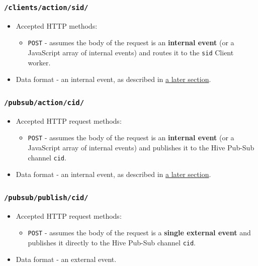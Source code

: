 \documentclass[a4paper]{article}
\begin{document}
\subsubsection{\texttt{/clients/action/sid/}}
\label{sec-6-1-5}



\begin{itemize}
\item Accepted HTTP methods:
\begin{itemize}
\item \texttt{POST} - assumes the body of the request is an \textbf{internal event} (or a JavaScript array of internal events) and routes it to the \texttt{sid} Client worker.
\end{itemize}
\item Data format - an internal event, as described in \hyperref[sec-9-3]{a later section}.
\end{itemize}
\subsubsection{\texttt{/pubsub/action/cid/}}
\label{sec-6-1-6}
\label{ref-api_pubsub}



\begin{itemize}
\item Accepted HTTP request methods:
\begin{itemize}
\item \texttt{POST} - assumes the body of the request is an \textbf{internal event} (or a JavaScript array of internal events) and publishes it to the Hive Pub-Sub channel \texttt{cid}.
\end{itemize}
\item Data format - an internal event, as described in \hyperref[sec-9-3]{a later section}.
\end{itemize}
\subsubsection{\texttt{/pubsub/publish/cid/}}
\label{sec-6-1-7}



\begin{itemize}
\item Accepted HTTP request methods:
\begin{itemize}
\item \texttt{POST} - assumes the body of the request is a \textbf{single external event} and publishes it directly to the Hive Pub-Sub channel \texttt{cid}.
\end{itemize}
\item Data format - an external event.
\end{itemize}
\end{document}
